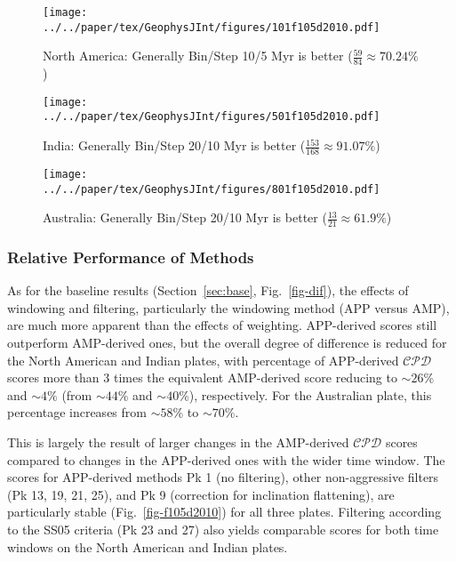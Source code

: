 \begin{figure*}
	\centering
	\begin{subfigure}{1\textwidth}
		\texttt{[image: ../../paper/tex/GeophysJInt/figures/101f105d2010.pdf]}
		\caption{North America: Generally Bin/Step 10/5 Myr is better
		($\frac{59}{84}\approx70.24\%$)}\label{fig-101f105d2010}
	\end{subfigure}
	\vspace{.1em}
	\begin{subfigure}{1\textwidth}
		\texttt{[image: ../../paper/tex/GeophysJInt/figures/501f105d2010.pdf]}
		\caption{India: Generally Bin/Step 20/10 Myr is better
		($\frac{153}{168}\approx91.07\%$)}\label{fig-501f105d2010}
	\end{subfigure}
	\vspace{.1em}
	\begin{subfigure}{1\textwidth}
		\texttt{[image: ../../paper/tex/GeophysJInt/figures/801f105d2010.pdf]}
		\caption{Australia: Generally Bin/Step 20/10 Myr is better
		($\frac{13}{21}\approx61.9\%$)}\label{fig-801f105d2010}
	\end{subfigure}
	\caption[]{Differences between grids in Fig.~\ref{fig-dif} (10 Myr bin, 5
Myr step) and Fig.~\ref{fig-dif2010} (20 Myr bin, 10 Myr step). The absolute
difference values less than 1.96-standard-deviation interval of the whole 168
values are labeled in green, more than 1.96-standard-deviation interval labeled
in red.}\label{fig-f105d2010}
\end{figure*}

\subsubsection{Relative Performance of Methods}

As for the baseline results (Section~\ref{sec:base}, Fig.~\ref{fig-dif}), the
effects of windowing and filtering, particularly the windowing method (APP
versus AMP), are much more apparent than the effects of weighting. APP-derived
scores still outperform AMP-derived ones, but the overall degree of difference
is reduced for the North American and Indian plates, with percentage of
APP-derived $\mathcal{CPD}$ scores more than 3 times the equivalent AMP-derived
score reducing to ${\sim}26$\% and ${\sim}4$\% (from ${\sim}44$\% and
${\sim}40$\%), respectively. For the Australian plate, this percentage increases
from ${\sim}58$\% to ${\sim}70$\%.

This is largely the result of larger changes in the AMP-derived $\mathcal{CPD}$
scores compared to changes in the APP-derived ones with the wider time window.
The scores for APP-derived methods Pk 1 (no filtering), other non-aggressive
filters (Pk 13, 19, 21, 25), and Pk 9 (correction for inclination flattening),
are particularly stable (Fig.~\ref{fig-f105d2010}) for all three plates.
Filtering according to the SS05 criteria (Pk 23 and 27) also yields comparable
scores for both time windows on the North American and Indian plates.

